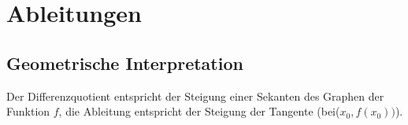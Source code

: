 \newpage

\section{Ableitungen}

\subsection{Geometrische Interpretation}
Der Differenzquotient entspricht der Steigung einer Sekanten des Graphen der
Funktion $f$, die Ableitung entspricht der Steigung der Tangente 
(bei($x_0, f(x_0))$).

